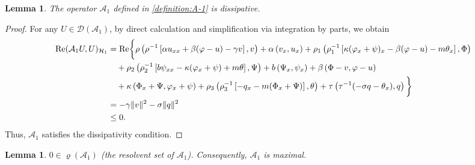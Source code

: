 \documentclass[11pt,reqno]{article}
\newtheorem{lemma}[theorem]{Lemma}
\begin{document}
\begin{lemma}\label{dissipative-1}
	The operator $\mathcal{A}_1$ defined in \eqref{definition:A-1} is dissipative.
\end{lemma}
\begin{proof}
	For any $U \in \mathcal{D}(\mathcal{A}_1)$, by direct calculation and simplification via integration by parts, we obtain
	\begin{align*}
		{\rm Re}(\mathcal{A}_1U,U)_{\mathcal{H}_1} &= {\rm Re}\bigg\{
		\rho\left(\rho^{-1} \left[ \alpha u_{xx} + \beta (\varphi - u) - \gamma v \right], v\right) + \alpha\left(v_x, u_x\right)  + \rho_1\left(\rho_1^{-1} \left[ \kappa (\varphi_x + \psi)_x - \beta (\varphi - u) - m \theta_x \right], \Phi\right) \\
		&\quad + \rho_2\left(\rho_2^{-1} \left[ b \psi_{xx} - \kappa (\varphi_x + \psi) + m\theta \right], \Psi\right) + b\left(\Psi_x,\psi_x\right) + \beta\left(\Phi - v, \varphi - u\right)  \\
		&\quad + \kappa\left(\Phi_x + \Psi, \varphi_x + \psi\right)  + \rho_3\left(\rho_3^{-1} \left[ -q_x - m (\Phi_x + \Psi) \right], \theta\right) + \tau\left(\tau^{-1}(-\sigma q - \theta_x),q\right) \bigg\} \\
		&= -\gamma\|v\|^2  - \sigma \|q\|^2\\
&\le 0.
		\end{align*}
	Thus, $\mathcal{A}_1$ satisfies the dissipativity condition.
\end{proof}
\begin{lemma}\label{maximal-1}
	$0 \in \varrho(\mathcal{A}_1)$ (the resolvent set of $\mathcal{A}_1$). Consequently, $\mathcal{A}_1$ is maximal.
\end{lemma}
\end{document}
